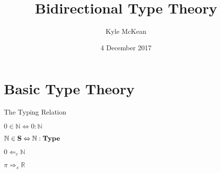 \documentclass[usenames,dvipsnames]{beamer}
\title{Bidirectional Type Theory}
\date{4 December 2017}
\author{Kyle McKean}
\institute{Reed Student Colloquium}
\newcommand{\mbb}[1]{\ensuremath{\mathbb{#1}}}     %
\newcommand{\checkType}[2]{\ensuremath{#2 \Leftarrow_c #1}}
\newcommand{\synthType}[2]{\ensuremath{#1 \Rightarrow_s #2}}
\begin{document}
  \maketitle
  \section{Basic Type Theory}
  \begin{frame}{The Typing Relation}
    \begin{itemize}
    \large{
      \setlength\itemsep{1em}
      \item $0 \in \mbb{N} \Leftrightarrow 0 : \mbb{N}$ 
      \item $\mbb{N} \in \bold{S} \Leftrightarrow \mbb{N} : \bold{Type}$ 
      \item $\checkType{\mbb{N}}{0}$
      \item $\synthType{\pi}{\mbb{R}}$
    }
    \end{itemize}
  \end{frame}
\end{document}
